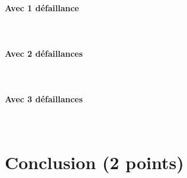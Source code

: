 \documentclass[a4paper]{book}
\begin{document}
\paragraph{Avec 1 défaillance}\ \\


\paragraph{Avec 2 défaillances}\ \\


\paragraph{Avec 3 défaillances}\ \\


\section{Conclusion (2 points)}
\end{document}
